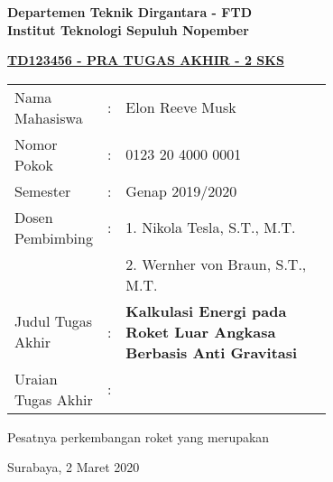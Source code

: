 \begin{flushleft}
  \textbf{Departemen Teknik Dirgantara - FTD}\\
  \textbf{Institut Teknologi Sepuluh Nopember}\\
\end{flushleft}

\begin{center}
  \underline{\textbf{TD123456 - PRA TUGAS AKHIR - 2 SKS}}
\end{center}

\begin{adjustwidth}{-0.2cm}{}
  \begin{tabular}{lcp{0.7\linewidth}}

    Nama Mahasiswa &:& Elon Reeve Musk \\
    Nomor Pokok &:&	0123 20 4000 0001 \\

    Semester &:& Genap 2019/2020 \\

    Dosen Pembimbing &:& 1. Nikola Tesla, S.T., M.T. \\
    & & 2. Wernher von Braun, S.T., M.T. \\

    Judul Tugas Akhir &:& \textbf{Kalkulasi Energi pada Roket Luar Angkasa Berbasis Anti Gravitasi} \\

    Uraian Tugas Akhir &:& \\
  \end{tabular}
\end{adjustwidth}

Pesatnya perkembangan roket yang merupakan \lipsum[1]
\vspace{1ex}

\begin{flushright}
  Surabaya, 2 Maret 2020
\end{flushright}
\vspace{1ex}

